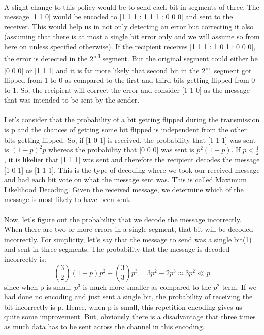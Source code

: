 \documentclass[11pt,a4paper]{article}
\begin{document}
\paragraph{}
A slight change to this policy would be to send each bit in segments of three. The message [1 1 0] would be encoded to [1 1 1 : 1 1 1 : 0 0 0] and sent to the receiver. This would help us in not only detecting an error but correcting it also (assuming that there is at most a single bit error only and we will assume so from here on unless specified otherwise). If the recipient receives [1 1 1 : 1 0 1 : 0 0 0], the error is detected in the 2\textsuperscript{nd} segment. But the original segment could either be [0 0 0] or [1 1 1] and it is far more likely that second bit in the 2\textsuperscript{nd} segment got flipped from 1 to 0 as compared to the first and third bits getting flipped from 0 to 1. So, the recipient will correct the error and consider [1 1 0] as the message that was intended to be sent by the sender. 
\paragraph{}
Let's consider that the probability of a bit getting flipped during the transmission is p and the chances of getting some bit flipped is independent from the other bits getting flipped. So, if [1 0 1] is received, the probability that [1 1 1] was sent is $(1-p)^{2}p$ whereas the probability that [0 0 0] was sent is $p^{2}(1-p)$. If $p < \frac{1}{2}$, it is likelier that [1 1 1] was sent and therefore the recipient decodes the message [1 0 1] as [1 1 1]. This is the type of decoding where we took our received message and had each bit vote on what the message sent was. This is called Maximum Likelihood Decoding. Given the received message, we determine which of the message is most likely to have been sent. 
\paragraph{}
Now, let's figure out the probability that we decode the message incorrectly. When there are two or more errors in a single segment, that bit will be decoded incorrectly. For simplicity, let's say that the message to send was a single bit(1) and sent in three segments. The probability that the message is decoded incorrectly is:
\begin{equation}
    {3\choose 2}(1-p)p^{2} + {3\choose 3}p^{3} = 3p^{2} - 2p^{3} \approx 3p^{2} \ll p
\end{equation}
since when p is small, $p^{3}$ is much more smaller as compared to the $p^{2}$ term. If we had done no encoding and just sent a single bit, the probability of receiving the bit incorrectly is p. Hence, when p is small, this repetition encoding gives us quite some improvement. But, obviously there is a disadvantage that three times as much data has to be sent across the channel in this encoding. 
\end{document}
